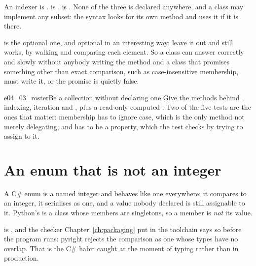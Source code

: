 
\noindent
An indexer is .  is .
 is . None of the three is declared
anywhere, and a class may implement any subset: the syntax looks for its
own method and uses it if it is there.


\begin{note}
 is the optional one, and optional in an interesting
way: leave it out and  still works, by walking
 and comparing each element. So a class can answer
 correctly and slowly without anybody writing the method \dash{}
and a class that promises something other than exact comparison, such as
case-insensitive membership, must write it, or the promise is quietly
false.
\end{note}

\begin{exercise}{e04_03_roster}{Be a collection without declaring one}
Give  the methods behind , indexing, iteration and
, plus a read-only computed . Two of the five tests
are the ones that matter: membership has to ignore case, which is the only
method not merely delegating, and  has to be a property, which
the test checks by trying to assign to it.
\end{exercise}

\section{An enum that is not an integer}
\label{sec:ch04-enums}

A C\# enum is a named integer and behaves like one everywhere: it compares
to an integer, it serialises as one, and a value nobody declared is still
assignable to it. Python's  is a class whose members are
singletons, so a member is \emph{not} its value.



\noindent
{} is , and the checker Chapter~\ref{ch:packaging} put
in the toolchain says so before the program runs: pyright rejects the
comparison as one whose types have no overlap. That is the C\# habit caught
at the moment of typing rather than in production.

